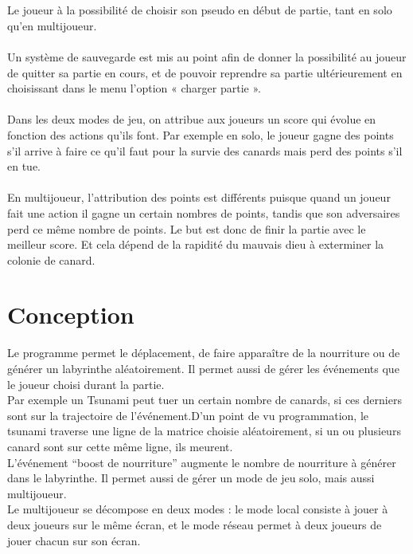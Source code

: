 \documentclass[12pt,a4paper,twoside]{article}
\begin{document}
\\ \\
Le joueur à la possibilité de choisir son pseudo en début de partie, tant en solo qu'en multijoueur.
\\ \\
Un système de sauvegarde est mis au point afin de donner la possibilité au joueur de quitter sa partie en cours, et de pouvoir reprendre sa partie ultérieurement en choisissant dans le menu l'option « charger partie ».
\\ \\
Dans les deux modes de jeu, on attribue aux joueurs un score qui évolue en fonction des actions qu’ils font.
Par exemple en solo, le joueur gagne des points s’il arrive à faire ce qu'il faut pour la survie des canards mais perd des points s’il en tue.
\\ \\
En multijoueur, l’attribution des points est différents puisque quand un joueur fait une action il gagne un certain nombres de points, tandis que son adversaires perd ce même nombre de points. Le but est donc de finir la partie avec le meilleur score. Et cela dépend de la rapidité du mauvais dieu à exterminer la colonie de canard.
\newpage
\section{Conception}
Le programme permet le déplacement, de faire apparaître de la nourriture ou de générer un labyrinthe aléatoirement. Il permet aussi de gérer les événements que le joueur choisi durant la partie. 
\\Par exemple un Tsunami peut tuer un certain nombre de canards, si ces derniers sont sur la trajectoire de l'événement.D’un point de vu programmation, le tsunami traverse une ligne de la matrice choisie aléatoirement, si un ou plusieurs canard sont sur cette même ligne, ils meurent.
\\L'événement “boost de nourriture” augmente le nombre de nourriture à générer dans le labyrinthe.
Il permet aussi de gérer un mode de jeu solo, mais aussi multijoueur.
\\Le multijoueur se décompose en deux modes : le mode local consiste à jouer à deux joueurs sur le même écran, et le mode réseau permet à deux joueurs de jouer chacun sur son écran.
\end{document}
